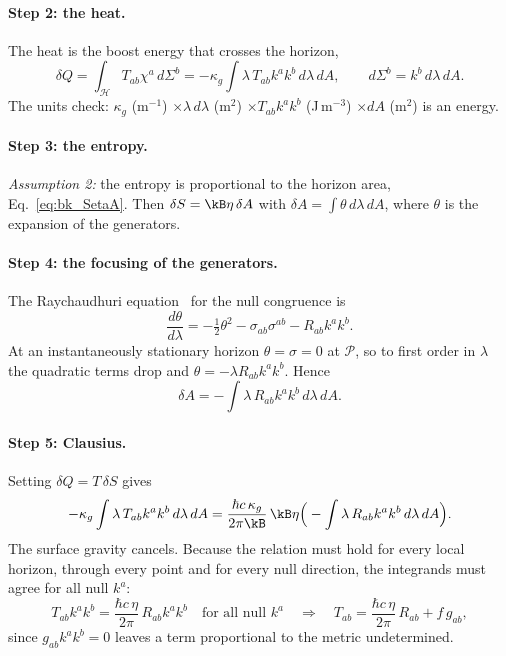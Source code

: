 \paragraph{Step 2: the heat.} The heat is the boost energy that crosses the horizon,
\begin{equation}
\delta Q=\int_{\mathcal H}T_{ab}\chi^a\,d\Sigma^b=-\kappa_g\int\lambda\,T_{ab}k^ak^b\,d\lambda\,dA ,\qquad d\Sigma^b=k^b\,d\lambda\,dA .
\end{equation}
The units check: $\kappa_g$ (m$^{-1}$) $\times\lambda\,d\lambda$ (m$^2$) $\times T_{ab}k^ak^b$ (J\,m$^{-3}$) $\times dA$ (m$^2$) is an energy.

\paragraph{Step 3: the entropy.} \emph{Assumption 2:} the entropy is proportional to the horizon area, Eq.~\eqref{eq:bk_SetaA}. Then $\delta S=\kB\eta\,\delta A$
with $\delta A=\int\theta\,d\lambda\,dA$, where $\theta$ is the expansion of the generators. \derived

\paragraph{Step 4: the focusing of the generators.} The Raychaudhuri equation~\cite{Raychaudhuri1955} for the null congruence is
\begin{equation}
\frac{d\theta}{d\lambda}=-\tfrac12\theta^2-\sigma_{ab}\sigma^{ab}-R_{ab}k^ak^b .
\end{equation}
At an instantaneously stationary horizon $\theta=\sigma=0$ at $\mathcal P$, so to first order in $\lambda$ the quadratic terms drop and
$\theta=-\lambda R_{ab}k^ak^b$. Hence
\begin{equation}
\delta A=-\int\lambda\,R_{ab}k^ak^b\,d\lambda\,dA .
\end{equation}

\paragraph{Step 5: Clausius.} Setting $\delta Q=T\,\delta S$ gives
\begin{equation}
-\kappa_g\int\lambda\,T_{ab}k^ak^b\,d\lambda\,dA=\frac{\hbar c\,\kappa_g}{2\pi\kB}\,\kB\eta\Big(-\int\lambda\,R_{ab}k^ak^b\,d\lambda\,dA\Big).
\end{equation}
The surface gravity cancels. Because the relation must hold for every local horizon, through every point and for every null direction, the integrands
must agree for all null $k^a$:
\begin{equation}
T_{ab}k^ak^b=\frac{\hbar c\,\eta}{2\pi}\,R_{ab}k^ak^b\quad\text{for all null }k^a\quad\Longrightarrow\quad T_{ab}=\frac{\hbar c\,\eta}{2\pi}\,R_{ab}+f\,g_{ab},
\end{equation}
since $g_{ab}k^ak^b=0$ leaves a term proportional to the metric undetermined.

